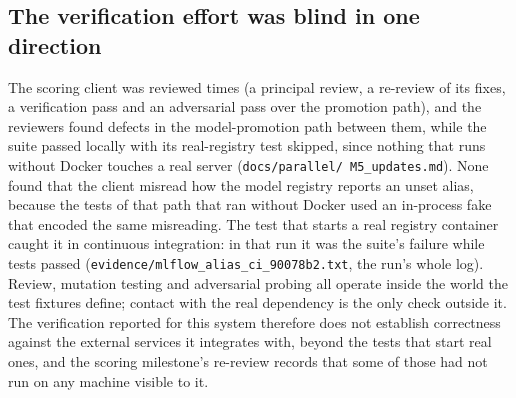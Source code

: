 \subsection*{The verification effort was blind in one direction}
 The scoring client was reviewed
\nFakeReviews{} times (a principal review, a re-review of its fixes, a verification pass and an
adversarial pass over the promotion path), and the reviewers found \nFakeDefects{} defects in the
model-promotion path between them, while the suite passed locally with its real-registry test skipped,
since nothing that runs without Docker touches a real server (\texttt{docs/\allowbreak parallel/\allowbreak
M5\_updates.md}). None found that the client misread how the model registry reports an unset alias,
because the tests of that path that ran without Docker used an in-process fake that encoded the same
misreading. The test that starts a real registry container caught it in continuous integration: in that run it was the suite's
\nFakeCiFailed{} failure while \nFakeCiPassed{} tests passed
(\texttt{evidence/\allowbreak mlflow\_\allowbreak alias\_\allowbreak ci\_\allowbreak 90078b2.txt}, the
run's whole log). Review, mutation testing and
adversarial probing all operate inside the world the test fixtures define; contact with the real
dependency is the only check outside it. The verification reported for this system therefore does
not establish correctness against the external services it integrates with, beyond the tests that
start real ones, and the scoring milestone's re-review records that some of those had not run on any
machine visible to it.
